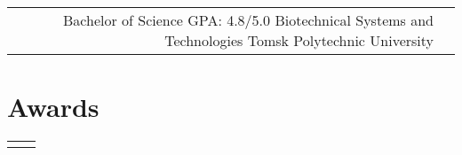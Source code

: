\documentclass[10pt]{article} %
\begin{document}
\begin{paracol}{2}
\begin{supertabular}{rl}
	{Bachelor of Science} %
	{GPA: 4.8/5.0} %
	{Biotechnical Systems and Technologies} %
	{Tomsk Polytechnic University} %
	

\end{supertabular}


\section{Awards}





\begin{supertabular}{rl} %
	
	
	
	
	
	
\end{supertabular}



\end{paracol}
\end{document}
